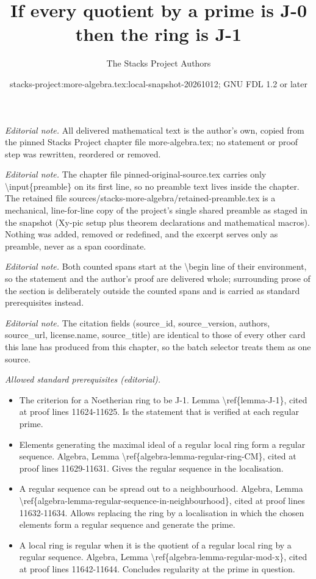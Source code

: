 \documentclass[10pt,a4paper]{amsart}
\title{If every quotient by a prime is J-0 then the ring is J-1}
\author{The Stacks Project Authors}
\date{stacks-project:more-algebra.tex:local-snapshot-20261012; GNU FDL 1.2 or later}
\theoremstyle{plain}
\theoremstyle{definition}
\theoremstyle{remark}
\numberwithin{equation}{subsection}
\begin{document}
\maketitle
\setcounter{subsection}{1}
\noindent\textit{Editorial note.} All delivered mathematical text is the author's own, copied from the pinned Stacks Project chapter file more-algebra.tex; no statement or proof step was rewritten, reordered or removed.\par\medskip
\noindent\textit{Editorial note.} The chapter file pinned-original-source.tex carries only \textbackslash{}input\{preamble\} on its first line, so no preamble text lives inside the chapter. The retained file sources/stacks-more-algebra/retained-preamble.tex is a mechanical, line-for-line copy of the project's single shared preamble as staged in the snapshot (Xy-pic setup plus theorem declarations and mathematical macros). Nothing was added, removed or redefined, and the excerpt serves only as preamble, never as a span coordinate.\par\medskip
\noindent\textit{Editorial note.} Both counted spans start at the \textbackslash{}begin line of their environment, so the statement and the author's proof are delivered whole; surrounding prose of the section is deliberately outside the counted spans and is carried as standard prerequisites instead.\par\medskip
\noindent\textit{Editorial note.} The citation fields (source\_id, source\_version, authors, source\_url, license.name, source\_title) are identical to those of every other card this lane has produced from this chapter, so the batch selector treats them as one source.\par\medskip
\noindent\textit{Allowed standard prerequisites (editorial).}\begin{itemize}
\item The criterion for a Noetherian ring to be J-1. Lemma \textbackslash{}ref\{lemma-J-1\}, cited at proof lines 11624-11625. Is the statement that is verified at each regular prime.
\item Elements generating the maximal ideal of a regular local ring form a regular sequence. Algebra, Lemma \textbackslash{}ref\{algebra-lemma-regular-ring-CM\}, cited at proof lines 11629-11631. Gives the regular sequence in the localisation.
\item A regular sequence can be spread out to a neighbourhood. Algebra, Lemma \textbackslash{}ref\{algebra-lemma-regular-sequence-in-neighbourhood\}, cited at proof lines 11632-11634. Allows replacing the ring by a localisation in which the chosen elements form a regular sequence and generate the prime.
\item A local ring is regular when it is the quotient of a regular local ring by a regular sequence. Algebra, Lemma \textbackslash{}ref\{algebra-lemma-regular-mod-x\}, cited at proof lines 11642-11644. Concludes regularity at the prime in question.
\end{itemize}\medskip
\end{document}
